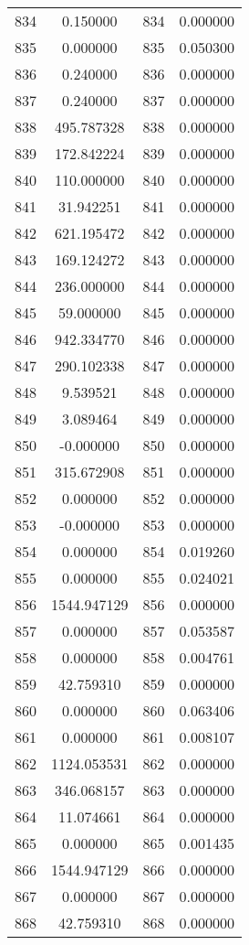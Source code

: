 \documentclass[12pt]{article}
\begin{document}
\begin{longtable}{@{}cccc@{}}
834 & 0.150000 & 834 & 0.000000 \\
835 & 0.000000 & 835 & 0.050300 \\
836 & 0.240000 & 836 & 0.000000 \\
837 & 0.240000 & 837 & 0.000000 \\
838 & 495.787328 & 838 & 0.000000 \\
839 & 172.842224 & 839 & 0.000000 \\
840 & 110.000000 & 840 & 0.000000 \\
841 & 31.942251 & 841 & 0.000000 \\
842 & 621.195472 & 842 & 0.000000 \\
843 & 169.124272 & 843 & 0.000000 \\
844 & 236.000000 & 844 & 0.000000 \\
845 & 59.000000 & 845 & 0.000000 \\
846 & 942.334770 & 846 & 0.000000 \\
847 & 290.102338 & 847 & 0.000000 \\
848 & 9.539521 & 848 & 0.000000 \\
849 & 3.089464 & 849 & 0.000000 \\
850 & -0.000000 & 850 & 0.000000 \\
851 & 315.672908 & 851 & 0.000000 \\
852 & 0.000000 & 852 & 0.000000 \\
853 & -0.000000 & 853 & 0.000000 \\
854 & 0.000000 & 854 & 0.019260 \\
855 & 0.000000 & 855 & 0.024021 \\
856 & 1544.947129 & 856 & 0.000000 \\
857 & 0.000000 & 857 & 0.053587 \\
858 & 0.000000 & 858 & 0.004761 \\
859 & 42.759310 & 859 & 0.000000 \\
860 & 0.000000 & 860 & 0.063406 \\
861 & 0.000000 & 861 & 0.008107 \\
862 & 1124.053531 & 862 & 0.000000 \\
863 & 346.068157 & 863 & 0.000000 \\
864 & 11.074661 & 864 & 0.000000 \\
865 & 0.000000 & 865 & 0.001435 \\
866 & 1544.947129 & 866 & 0.000000 \\
867 & 0.000000 & 867 & 0.000000 \\
868 & 42.759310 & 868 & 0.000000 \\

\end{longtable}
\end{document}
